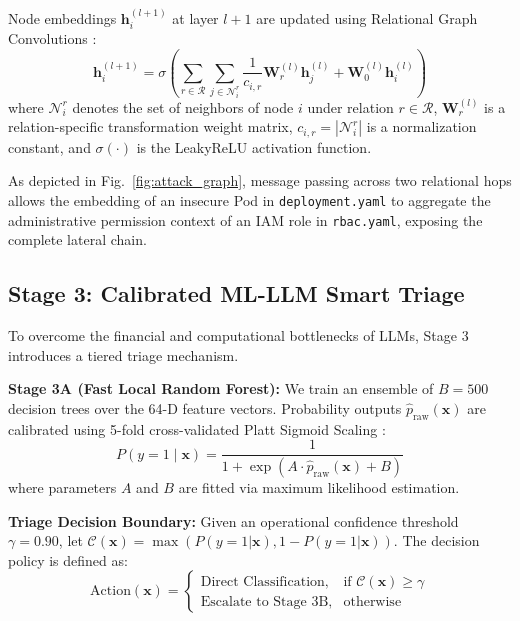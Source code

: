 \documentclass[conference]{IEEEtran}
\begin{document}
Node embeddings $\mathbf{h}_i^{(l+1)}$ at layer $l+1$ are updated using Relational Graph Convolutions \cite{schlichtkrull2018rgcn}:
\begin{equation}
\mathbf{h}_i^{(l+1)} = \sigma \left( \sum_{r \in \mathcal{R}} \sum_{j \in \mathcal{N}_i^r} \frac{1}{c_{i,r}} \mathbf{W}_r^{(l)} \mathbf{h}_j^{(l)} + \mathbf{W}_0^{(l)} \mathbf{h}_i^{(l)} \right)
\label{eq:rgcn}
\end{equation}
where $\mathcal{N}_i^r$ denotes the set of neighbors of node $i$ under relation $r \in \mathcal{R}$, $\mathbf{W}_r^{(l)}$ is a relation-specific transformation weight matrix, $c_{i,r} = |\mathcal{N}_i^r|$ is a normalization constant, and $\sigma(\cdot)$ is the LeakyReLU activation function.

As depicted in Fig.~\ref{fig:attack_graph}, message passing across two relational hops allows the embedding of an insecure Pod in \texttt{deployment.yaml} to aggregate the administrative permission context of an IAM role in \texttt{rbac.yaml}, exposing the complete lateral chain.

\subsection{Stage 3: Calibrated ML-LLM Smart Triage}
To overcome the financial and computational bottlenecks of LLMs, Stage 3 introduces a tiered triage mechanism.

\textbf{Stage 3A (Fast Local Random Forest):} We train an ensemble of $B = 500$ decision trees over the 64-D feature vectors. Probability outputs $\hat{p}_{\text{raw}}(\mathbf{x})$ are calibrated using 5-fold cross-validated Platt Sigmoid Scaling \cite{niculescu2005calibration}:
\begin{equation}
P(y = 1 \mid \mathbf{x}) = \frac{1}{1 + \exp(A \cdot \hat{p}_{\text{raw}}(\mathbf{x}) + B)}
\end{equation}
where parameters $A$ and $B$ are fitted via maximum likelihood estimation.

\textbf{Triage Decision Boundary:} Given an operational confidence threshold $\gamma = 0.90$, let $\mathcal{C}(\mathbf{x}) = \max(P(y=1|\mathbf{x}), 1 - P(y=1|\mathbf{x}))$. The decision policy is defined as:
\begin{equation}
\text{Action}(\mathbf{x}) = 
\begin{cases}
\text{Direct Classification}, & \text{if } \mathcal{C}(\mathbf{x}) \ge \gamma \\
\text{Escalate to Stage 3B}, & \text{otherwise}
\end{cases}
\end{equation}
\end{document}
